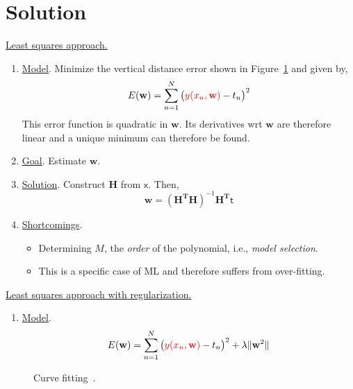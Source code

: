 \section{Solution}
\begin{enumerate}

{\color{blue}\item \underline{Least squares approach.}}
\begin{enumerate}
\item \underline{Model}.  Minimize the vertical distance error shown in Figure~\ref{fig:curve_fitting} and given by,
\begin{equation}
E(\mathbf{w}) = \sum\limits_{n=1}^N\big({\color{red}y(x_n,\mathbf{w})} - t_n\big)^2
\end{equation}
This error function is quadratic in $\mathbf{w}$.  Its derivatives wrt $\mathbf{w}$ are therefore linear and a unique minimum can therefore be found.
\item \underline{Goal}.  Estimate $\mathbf{w}$.
\item \underline{Solution}.  Construct $\mathbf{H}$ from $\mathsf{x}$.  Then,
\begin{equation}
\mathbf{w} = (\mathbf{H^TH})^{-1} \mathbf{H^T}\mathsf{t}
\end{equation}
\item \underline{Shortcomings}.  
\begin{itemize}
\item Determining $M$, the \emph{order} of the polynomial, i.e., \emph{model selection}.
\item This is a specific case of ML and therefore suffers from over-fitting.    
\end{itemize}
\end{enumerate}

{\color{blue}\item \underline{Least squares approach with regularization.}}
\begin{enumerate}
\item \underline{Model}.
\begin{equation}
E(\mathbf{w}) = \sum\limits_{n=1}^N\big({\color{red}y(x_n,\mathbf{w})} - t_n\big)^2 + \lambda{\|\mathbf{w}^2\|}
\end{equation}
\end{enumerate}

								\begin{figure}[t]
								\centering
								\caption{Curve fitting~\cite{2007_BOOK_PRML_Bishop}.}
								\label{fig:curve_fitting}
								\end{figure}



\end{enumerate}
